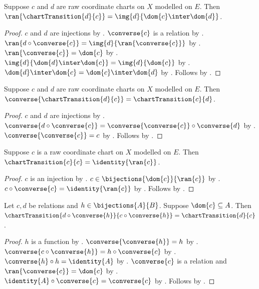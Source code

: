 \begin{theorem}\label{chart_transition_range}
    Suppose $c$ and $d$ are raw coordinate charts on $X$ modelled on $E$.
    Then $\ran{\chartTransition{d}{c}}
        =\img{d}{\dom{c}\inter\dom{d}}$.
\end{theorem}
\begin{proof}
    $c$ and $d$ are injections by .
    $\converse{c}$ is a relation by .
    $\ran{d\circ\converse{c}}=\img{d}{\ran{\converse{c}}}$ by
        .
    $\ran{\converse{c}}=\dom{c}$ by .
    $\img{d}{\dom{d}\inter\dom{c}}=\img{d}{\dom{c}}$ by
        .
    $\dom{d}\inter\dom{c}=\dom{c}\inter\dom{d}$ by .
    Follows by .
\end{proof}

\begin{theorem}\label{chart_transition_converse}
    Suppose $c$ and $d$ are raw coordinate charts on $X$ modelled on $E$.
    Then $\converse{\chartTransition{d}{c}}=\chartTransition{c}{d}$.
\end{theorem}
\begin{proof}
    $c$ and $d$ are injections by .
    $\converse{d\circ\converse{c}}
        =\converse{\converse{c}}\circ\converse{d}$ by .
    $\converse{\converse{c}}=c$ by .
    Follows by .
\end{proof}

\begin{theorem}\label{chart_transition_self}
    Suppose $c$ is a raw coordinate chart on $X$ modelled on $E$.
    Then $\chartTransition{c}{c}=\identity{\ran{c}}$.
\end{theorem}
\begin{proof}
    $c$ is an injection by .
    $c\in\bijections{\dom{c}}{\ran{c}}$ by
        .
    $c\circ\converse{c}=\identity{\ran{c}}$ by .
    Follows by .
\end{proof}

\begin{theorem}\label{chart_transition_change_of_source}
    Let $c,d$ be relations and $h\in\bijections{A}{B}$.
    Suppose $\dom{c}\subseteq A$.
    Then $\chartTransition{d\circ\converse{h}}{c\circ\converse{h}}
        =\chartTransition{d}{c}$.
\end{theorem}
\begin{proof}
    $h$ is a function by .
    $\converse{\converse{h}}=h$ by .
    $\converse{c\circ\converse{h}}=h\circ\converse{c}$ by .
    $\converse{h}\circ h=\identity{A}$ by .
    $\converse{c}$ is a relation and $\ran{\converse{c}}=\dom{c}$ by
        .
    $\identity{A}\circ\converse{c}=\converse{c}$ by .
    Follows by .
\end{proof}

